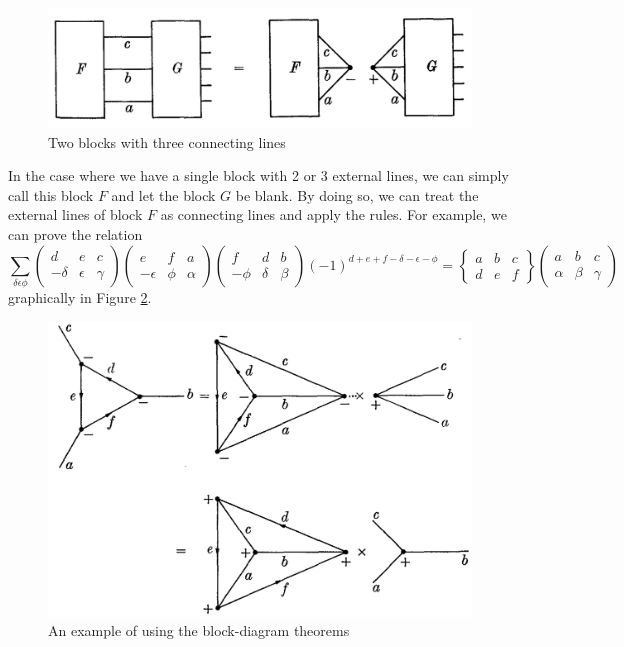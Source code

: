 \documentclass[11pt]{article}
\newcommand{\al}{\alpha}
\newcommand{\be}{\beta}
\newcommand{\tj}[6]{ \begin{pmatrix}
		#1 & #2 & #3 \\
		#4 & #5 & #6 
\end{pmatrix}}
\newcommand{\Gj}[6]{ \begin{Bmatrix}
		#1 & #2 & #3 \\
		#4 & #5 & #6 
\end{Bmatrix}}
\begin{document}
	\begin{figure}[!htb]
		\centering
		\includegraphics[scale=0.7]{blocks_three_lines}
		\caption{Two blocks with three connecting lines \cite{angular_momentum}}
		\label{fig:three}
	\end{figure}

In the case where we have a single block with 2 or 3 external lines, we can simply call this block $F$ and let the block $G$ be blank. By doing so, we can treat the external lines of block $F$ as connecting lines and apply the rules. For example, we can prove the relation
\begin{equation*}
\sum_{\delta\epsilon\phi}\tj{d}{e}{c}{-\delta}{\epsilon}{\gamma}\tj{e}{f}{a}{-\epsilon}{\phi}{\al}\tj{f}{d}{b}{-\phi}{\delta}{\beta}(-1)^{d+e+f-\delta-\epsilon-\phi} = \Gj{a}{b}{c}{d}{e}{f}\tj{a}{b}{c}{\al}{\be}{\gamma}
\end{equation*}
graphically in Figure \ref{fig:graph}.
\begin{figure}[!htb]
	\centering
	\includegraphics[scale=0.7]{blocks_ex}
	\caption{An example of using the block-diagram theorems \cite{angular_momentum}}
	\label{fig:graph}
\end{figure}
\end{document}
